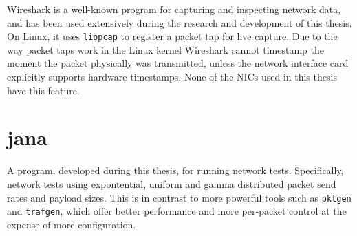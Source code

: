 Wireshark is a well-known program for capturing and inspecting network data,
and has been used extensively during the research and development of this
thesis. On Linux, it uses \texttt{libpcap} to register a packet tap for live
capture. Due to the way packet taps work in the Linux kernel Wireshark cannot
timestamp the moment the packet physically was transmitted, unless the network
interface card explicitly supports hardware timestamps. None of the NICs used
in this thesis have this feature.

\section{jana}

A program, developed during this thesis, for running network tests.
Specifically, network tests using expontential, uniform and gamma distributed
packet send rates and payload sizes. This is in contrast to more powerful
tools such as \texttt{pktgen} and \texttt{trafgen}, which offer better
performance and more per-packet control at the expense of more configuration.